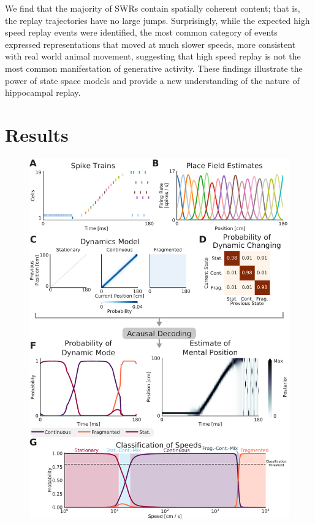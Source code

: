 \documentclass[times, twoside]{zHenriquesLab-StyleBioRxiv}
\begin{document}
We find that the majority of SWRs contain spatially coherent content; that is, the replay trajectories have no large jumps. Surprisingly, while the expected high speed replay events were identified, the most common category of events expressed representations that moved at much slower speeds, more consistent with real world animal movement, suggesting that high speed replay is not the most common manifestation of generative activity. These findings illustrate the power of state space models and provide a new understanding of the nature of hippocampal replay.

\section*{Results}
\begin{figure}%
\centering
\includegraphics[width=0.80\linewidth]{figures/Figure1/Figure1_v4}

\end{figure}
\end{document}
